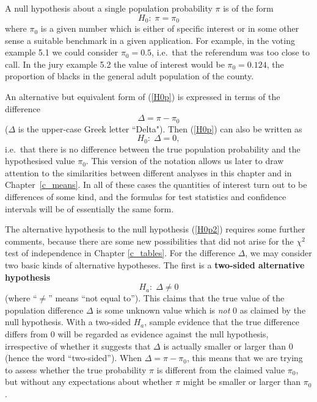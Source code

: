 A null hypothesis about a single population probability $\pi$ is of the
form
\begin{equation}
H_{0}:\; \pi=\pi_{0}
\label{H0p}
\end{equation}
where $\pi_{0}$ is a given number which is either of specific interest
or in some other sense a suitable benchmark in a given application. For
example, in the voting example 5.1 we could consider $\pi_{0}=0.5$,
i.e.\ that the referendum was too close to call. In the jury example 5.2
the value of interest would be $\pi_{0}=0.124$, the proportion of blacks
in the general adult population of the county.

An alternative but equivalent form of (\ref{H0p})
is expressed in terms of the difference
\begin{equation}
\Delta=\pi-\pi_{0}
\label{Dp}
\end{equation}
($\Delta$ is the upper-case Greek letter ``Delta"). Then (\ref{H0p}) can also be
written as
\begin{equation}
H_{0}: \; \Delta=0,
\label{H0p2}
\end{equation}
i.e.\ that there is no difference between the true population
probability and the hypothesised value $\pi_{0}$. This version
of the notation allows us later to
draw attention to the similarities between different analyses
in this chapter and in Chapter~\ref{c_means}. In all of these cases the
quantities of interest turn out to be differences of some kind, and the
formulas for test statistics and confidence intervals will be of
essentially the same form.

The alternative hypothesis to the null hypothesis (\ref{H0p2}) requires
some further comments, because there are some new possibilities that did
not arise for the $\chi^{2}$ test of independence in Chapter
\ref{c_tables}.
For the difference $\Delta$, we may consider two basic kinds of
alternative hypotheses. The first is a \textbf{two-sided alternative
hypothesis}
\begin{equation}
H_{a}: \; \Delta\ne 0
\label{Hatwo}
\end{equation}
(where ``$\ne$'' means ``not equal to''). This claims that the true
value of the population difference $\Delta$ is some unknown value which
is \emph{not} 0 as claimed by the null hypothesis. With a two-sided
$H_{a}$, sample evidence that the true difference differs from 0 will be
regarded as evidence against the null hypothesis, irrespective of
whether it suggests that $\Delta$ is actually smaller or larger than 0
(hence the word ``two-sided''). When $\Delta=\pi-\pi_{0}$, this means
that we are trying to assess whether the true probability $\pi$ is
different from the claimed value $\pi_{0}$, but without any expectations
about whether $\pi$ might be smaller or larger than $\pi_{0}$.

